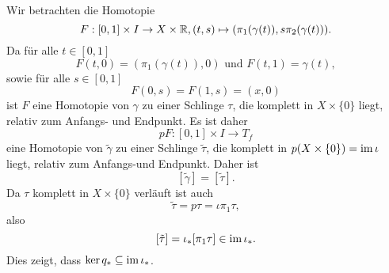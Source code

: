 \documentclass[a4paper,10pt]{article}
\begin{document}
Wir betrachten die Homotopie
\[
 F : [0,1] \times I \to X \times \mathbb{R}, (t,s) \mapsto ( \pi_1(\gamma(t)), s \pi_2(\gamma(t)) ).
\]
Da für alle $t \in [0,1]$
\[
 F(t,0) = (\pi_1(\gamma(t)),0) \text{ und }
 F(t,1) = \gamma(t),
\]
sowie für alle $s \in [0,1]$
\[
 F(0,s) = F(1,s) = (x,0)
\]
ist $F$ eine Homotopie von $\gamma$ zu einer Schlinge $\tau$, die komplett in $X \times \{0\}$ liegt, relativ zum Anfangs- und Endpunkt. Es ist daher
\[
 p F : [0,1] \times I \to T_f
\]
eine Homotopie von $\tilde{\gamma}$ zu einer Schlinge $\tilde{\tau}$, die komplett in $p(X \times \{0\}) = \operatorname{im} \iota$ liegt, relativ zum Anfangs-und Endpunkt. Daher ist
\[
 [\tilde{\gamma}] = [\tilde{\tau}].
\]
Da $\tau$ komplett in $X \times \{0\}$ verläuft ist auch
\[
 \tilde{\tau} = p \tau = \iota \pi_1 \tau,
\]
also
\[
 [\tilde{\tau}] = \iota_* [\pi_1 \tau] \in \operatorname{im} \iota_*.
\]
Dies zeigt, dass $\ker q_* \subseteq \operatorname{im} \iota_*$.
\end{document}
